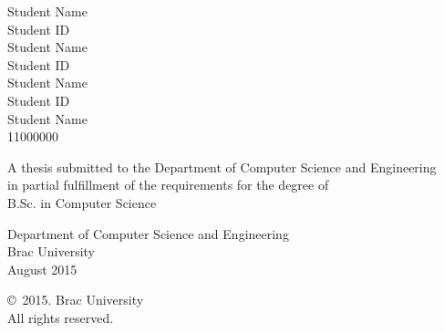 \begin{titlepage}
\renewcommand*{\thepage}{Title} %

    \begin{center} 
        \vspace*{3cm} %
        
        {\fontsize{16pt}{22pt}\selectfont{Predicting a T20 Cricket Match Result While \\
        The Match is in Progress}
        } %
        
        \vspace{1.5cm}
        
        
        \vspace{0.5cm}
        
        	Student Name\\
	        Student ID\\
	        Student Name\\
	        Student ID\\
	        Student Name\\
	        Student ID\\
	        Student Name\\
	        11000000

        \vspace{1.5cm}
        
        	A thesis submitted to the Department of Computer Science and Engineering\\
            in partial fulfillment of the requirements for the degree of\\
            B.Sc. in Computer Science

        
        \vspace{2.5cm}
        
    		Department of Computer Science and Engineering\\
            Brac University\\
            August 2015
        
        \vspace{3cm}
        
    		\copyright\ 2015. Brac University\\
            All rights reserved.
    
    \end{center}

\end{titlepage}